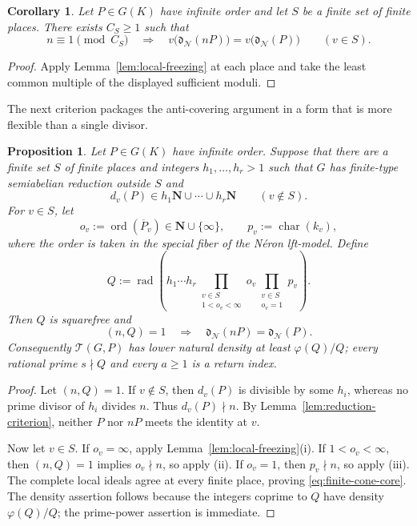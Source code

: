\documentclass[11pt,letterpaper,reqno]{amsart}
\newtheorem{proposition}[theorem]{Proposition}
\newtheorem{corollary}[theorem]{Corollary}
\theoremstyle{definition}
\theoremstyle{remark}
\newcommand{\N}{\mathbf N}
\newcommand{\ord}{\operatorname{ord}}
\newcommand{\rad}{\operatorname{rad}}
\newcommand{\dd}{\mathfrak d}
\newcommand{\Ner}{\mathcal N}
\begin{document}
\begin{corollary}\label{cor:simultaneous-freezing}
Let $P\in G(K)$ have infinite order and let $S$ be a finite set of finite
places.  There exists $C_S\ge1$ such that
\[
 n\equiv1\pmod{C_S}
 \quad\Longrightarrow\quad
 v\bigl(\dd_{\Ner}(nP)\bigr)=v\bigl(\dd_{\Ner}(P)\bigr)
 \qquad(v\in S).
\]
\end{corollary}

\begin{proof}
Apply Lemma~\ref{lem:local-freezing} at each place and take the least common
multiple of the displayed sufficient moduli.
\end{proof}

The next criterion packages the anti-covering argument in a form that is more flexible than a single divisor.

\begin{proposition}
\label{prop:finite-cone-return}
Let $P\in G(K)$ have infinite order.  Suppose that there are a finite set $S$
of finite places and integers $h_1,\ldots,h_r>1$ such that $G$ has finite-type
semiabelian reduction outside $S$ and
\[
 d_v(P)\in h_1\N\cup\cdots\cup h_r\N
 \qquad(v\notin S).
\]
For $v\in S$, let
\[
 o_v:=\ord(\overline P_v)\in\N\cup\{\infty\},
 \qquad p_v:=\operatorname{char}(k_v),
\]
where the order is taken in the special fiber of the N\'eron lft-model.  Define
\[
 Q:=\rad\!\left(
 h_1\cdots h_r
 \prod_{\substack{v\in S\\1<o_v<\infty}}o_v
 \prod_{\substack{v\in S\\o_v=1}}p_v
 \right).
\]
Then $Q$ is squarefree and
\begin{equation}\label{eq:finite-cone-core}
 (n,Q)=1
 \quad\Longrightarrow\quad
 \dd_{\Ner}(nP)=\dd_{\Ner}(P).
\end{equation}
Consequently $\mathscr T(G,P)$ has lower natural density at least
$\varphi(Q)/Q$; every rational prime $s\nmid Q$ and every $a\ge1$ is a return
index.
\end{proposition}

\begin{proof}
Let $(n,Q)=1$.  If $v\notin S$, then $d_v(P)$ is divisible by some $h_i$,
whereas no prime divisor of $h_i$ divides $n$.  Thus $d_v(P)\nmid n$.
By Lemma~\ref{lem:reduction-criterion}, neither $P$ nor $nP$ meets the identity at
$v$.

Now let $v\in S$.  If $o_v=\infty$, apply
Lemma~\ref{lem:local-freezing}(i).  If $1<o_v<\infty$, then $(n,Q)=1$ implies
$o_v\nmid n$, so apply (ii).  If $o_v=1$, then $p_v\nmid n$, so apply (iii).
The complete local ideals agree at every finite place, proving
\eqref{eq:finite-cone-core}.  The density assertion follows because the
integers coprime to $Q$ have density $\varphi(Q)/Q$; the prime-power assertion
is immediate.
\end{proof}
\end{document}
